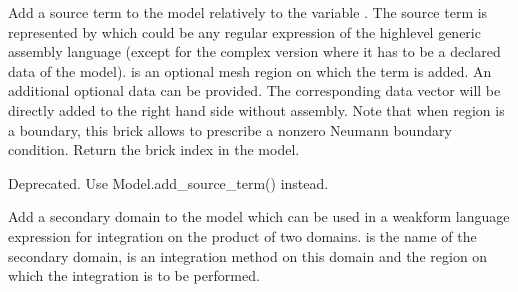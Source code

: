 \documentclass[a4paper,11pt,english]{sphinxmanual}
\begin{document}
\begin{fulllineitems}
\begin{fulllineitems}
Add a source term to the model relatively to the variable .
The source term is
represented by  which could be any regular expression of the
high\sphinxhyphen{}level generic assembly language (except for the complex version
where it has to be a declared data of the model).
 is an optional mesh region
on which the term is added. An additional optional data 
can be provided. The corresponding data vector will be directly added
to the right hand side without assembly. Note that when region is a
boundary, this brick allows to prescribe a nonzero Neumann boundary
condition. Return the brick index in the model.

\end{fulllineitems}


\begin{fulllineitems}
\label{\detokenize{python/cmdref_Model:getfem.Model.add_source_term_generic_assembly_brick}}
Deprecated. Use Model.add\_source\_term() instead.

\end{fulllineitems}


\begin{fulllineitems}
\label{\detokenize{python/cmdref_Model:getfem.Model.add_standard_secondary_domain}}
Add a secondary domain to the model which can be used in a weak\sphinxhyphen{}form language expression for integration on the product of two domains.  is the name
of the secondary domain,  is an integration method on this domain
and  the region on which the integration is to be performed.

\end{fulllineitems}


\end{fulllineitems}
\end{document}
